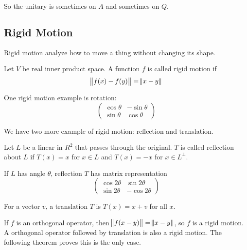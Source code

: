 So the unitary is sometimes on $A$ and sometimes on $Q$.


\subsection{Rigid Motion}

Rigid motion analyze how to move a thing without changing its shape.

\begin{definition}
    Let $V$ be real inner product space. A function $f$ is called rigid motion if 
    \begin{equation}
        \norm{f(x) - f(y)} = \norm{x - y}
    \end{equation}
\end{definition}

One rigid motion example is rotation:
\begin{equation}
    \begin{pmatrix}
        \cos \theta & - \sin \theta \\
        \sin \theta & \cos \theta
    \end{pmatrix}
\end{equation}


We have two more example of rigid motion: reflection and translation.

\begin{definition}[Reflection]
    Let $L$ be a linear in $R^2$ that passes through the original. $T$ is called reflection about $L$ if $T(x) = x$ for $x \in L$ and $T(x) = -x$ for $x \in L^\perp$.
\end{definition}

If $L$ has angle $\theta$, reflection $T$ has matrix representation 
\begin{equation}
    \begin{pmatrix}
        \cos 2\theta & \sin 2\theta \\
        \sin 2\theta & -\cos 2\theta
    \end{pmatrix}
\end{equation}

\begin{definition}[Translation]
    For a vector $v$, a translation $T$ is $T(x) = x + v$ for all $x$.
\end{definition}

If $f$ is an orthogonal operator, then $\norm{f(x-y)} = \norm{x-y}$, so $f$ is a rigid motion. A orthogonal operator followed by translation is also a rigid motion. The following theorem proves this is the only case.

